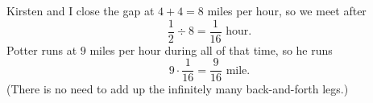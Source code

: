 Kirsten and I close the gap at $4+4=8$ miles per hour, so we meet after
\[
\dfrac{1}{2}\div8=\dfrac{1}{16}\text{ hour}.
\]
Potter runs at $9$ miles per hour during all of that time, so he runs
\[
9\cdot\dfrac{1}{16}=\boxed{\dfrac{9}{16}}\text{ mile}.
\]
(There is no need to add up the infinitely many back-and-forth legs.)
